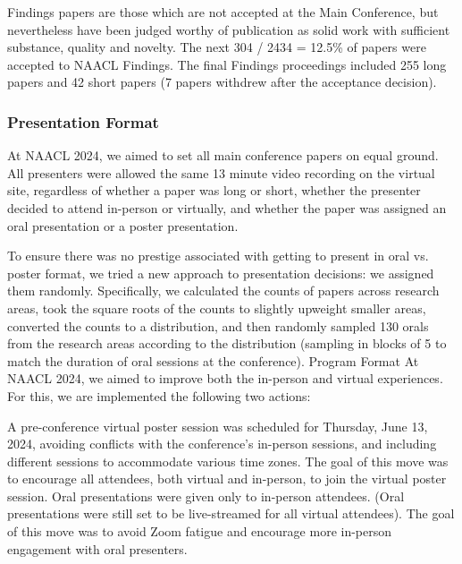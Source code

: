 Findings papers are those which are not accepted at the Main Conference, but nevertheless have been judged worthy of publication as solid work with sufficient substance, quality and novelty. The next 304 / 2434 = 12.5\% of papers were accepted to NAACL Findings. The final Findings proceedings included 255 long papers and 42 short papers (7 papers withdrew after the acceptance decision).

\subsubsection*{Presentation Format}
At NAACL 2024, we aimed to set all main conference papers on equal ground. All presenters were allowed the same 13 minute video recording on the virtual site, regardless of whether a paper was long or short, whether the presenter decided to attend in-person or virtually, and whether the paper was assigned an oral presentation or a poster presentation.

To ensure there was no prestige associated with getting to present in oral vs. poster format, we tried a new approach to presentation decisions: we assigned them randomly. Specifically, we calculated the counts of papers across research areas, took the square roots of the counts to slightly upweight smaller areas, converted the counts to a distribution, and then randomly sampled 130 orals from the research areas according to the distribution (sampling in blocks of 5 to match the duration of oral sessions at the conference).
Program Format
At NAACL 2024, we aimed to improve both the in-person and virtual experiences. For this, we are implemented the following two actions:

A pre-conference virtual poster session was scheduled for Thursday, June 13, 2024, avoiding conflicts with the conference’s in-person sessions, and including different sessions to accommodate various time zones. The goal of this move was to encourage all attendees, both virtual and in-person, to join the virtual poster session.
Oral presentations were given only to in-person attendees. (Oral presentations were still set to be live-streamed for all virtual attendees). The goal of this move was to avoid Zoom fatigue and encourage more in-person engagement with oral presenters.

